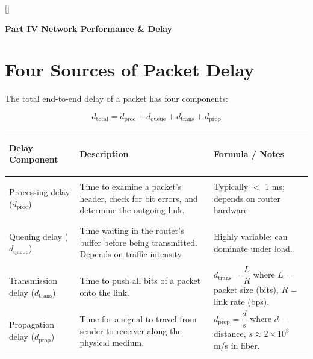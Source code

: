 \documentclass[11pt, letterpaper]{article}
\newcommand{\tealsections}{%
  \titleformat{\section}{\large\bfseries\color{sectionteal}}{}{0em}{}[\color{sectionteal}\titlerule]%
  \titleformat{\subsection}{\normalsize\bfseries\color{sectionteal!80!black}}{}{0em}{}%
}
\newcommand{\partbanner}[3]{%
  \begin{tcolorbox}[colback=#1, colframe=#2, boxrule=1.2pt, arc=4pt,
    left=8pt, right=8pt, top=6pt, bottom=6pt]
    \begin{center}{\LARGE\bfseries #3}\end{center}
  \end{tcolorbox}%
}
\begin{document}
\tealsections
{}
\partbanner{part5bg}{sectionteal}{Part IV \quad Network Performance \& Delay}

\vspace{8pt}

\section*{Four Sources of Packet Delay}

The total end-to-end delay of a packet has four components:

\[
  d_{\text{total}} = d_{\text{proc}} + d_{\text{queue}} + d_{\text{trans}} + d_{\text{prop}}
\]

\noindent
{\renewcommand{\arraystretch}{1.6}
\begin{tabularx}{\textwidth}{>{\bfseries\raggedright\arraybackslash}p{3.4cm}
                              >{\raggedright\arraybackslash}X
                              >{\raggedright\arraybackslash}p{3.8cm}}
\toprule
\rowcolor{tableheaderteal}
\textbf{Delay Component} & \textbf{Description} & \textbf{Formula / Notes} \\
\midrule
\rowcolor{rowTe} Processing delay ($d_{\text{proc}}$) & Time to examine a packet's header, check for bit errors, and determine the outgoing link. & Typically $<$ 1 ms; depends on router hardware. \\
\rowcolor{rowA}  Queuing delay ($d_{\text{queue}}$)    & Time waiting in the router's buffer before being transmitted. Depends on traffic intensity. & Highly variable; can dominate under load. \\
\rowcolor{rowTe} Transmission delay ($d_{\text{trans}}$) & Time to push all bits of a packet onto the link. & $d_{\text{trans}} = \dfrac{L}{R}$ where $L$ = packet size (bits), $R$ = link rate (bps). \\
\rowcolor{rowA}  Propagation delay ($d_{\text{prop}}$) & Time for a signal to travel from sender to receiver along the physical medium. & $d_{\text{prop}} = \dfrac{d}{s}$ where $d$ = distance, $s \approx 2\times10^8$ m/s in fiber. \\
\bottomrule
\end{tabularx}}
\end{document}
